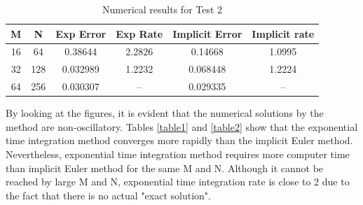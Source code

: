 \bgroup
\def\arraystretch{1.5}
\begin{table}[H]
    \caption{Numerical results for Test 2}    %
    \label{table2}
    \vspace{1mm}
    \centering                              %
    \begin{tabular}{c c c c c c}              %
    \hline\hline                            %
    M & N & Exp Error & Exp Rate & Implicit Error & Implicit rate \\ [0.5ex] 
    \hline                              %
    16 & 64 & 0.38644 & 2.2826 & 0.14668 & 1.0995 \\
    32 & 128 & 0.032989 & 1.2232 & 0.068448 & 1.2224 \\
    64 & 256 & 0.030307 & -- & 0.029335 & -- \\ [1ex]         %
    \hline                              %
    \end{tabular}
    \label{table:nonlin}                %
\end{table}
\egroup


By looking at the figures, it is evident that the numerical solutions by the method are non-oscillatory. Tables \ref{table1} and \ref{table2} show that the exponential time integration method converges more rapidly than the implicit Euler method. Nevertheless, exponential time integration method requires more computer time than implicit Euler method for the same M and N. Although it cannot be reached by large M and N, exponential time integration rate is close to 2 due to the fact that there is no actual "exact solution".